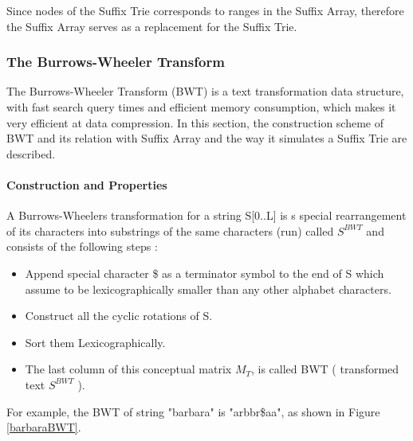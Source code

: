 \documentclass[11pt,a4paper]{report}
\begin{document}
Since nodes of the Suffix Trie corresponds to ranges in the Suffix 
Array, therefore the Suffix Array serves as a replacement for 
the Suffix Trie.



\subsubsection{The Burrows-Wheeler Transform} 
\label{The Burrows-Wheeler Transform}


The Burrows-Wheeler Transform (BWT) is a text transformation data structure, 
with fast search query times and efficient memory consumption, which makes 
it very efficient at data compression. In this section, the construction scheme
of BWT and its relation with Suffix Array and the way it simulates a Suffix Trie 
are described.\\



\paragraph{Construction and Properties}

A Burrows-Wheelers transformation for a string S[0..L] is s special rearrangement 
of its characters into substrings of the same characters (run) called $S^{BWT}$ 
and consists of the following steps \cite{bwt}:

\begin{itemize} 
	\item Append special character \$ as a terminator symbol to the end of S 
	which assume to be lexicographically smaller than any other alphabet 
	characters.
	\item  Construct all the cyclic rotations of S.
	\item  Sort them Lexicographically.
	\item The last column of this conceptual matrix \emph{$M_{T}$}, is called 
	BWT ( transformed text $S^{BWT}$ ).
\end{itemize}


For example, the BWT of string "barbara" is "arbbr\$aa", as shown in Figure 
\ref{barbaraBWT}.\\
\end{document}
